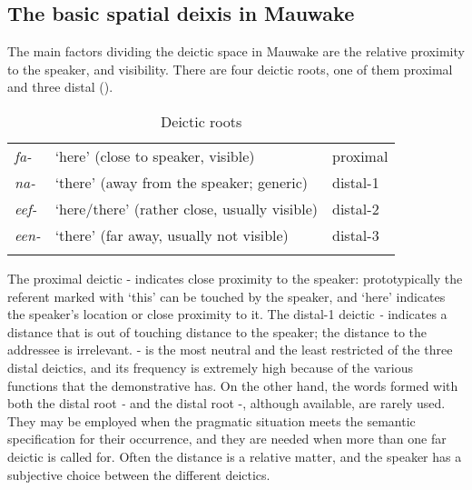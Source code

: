 \subsection{The basic spatial deixis in Mauwake}
{}
The main factors dividing the deictic space in Mauwake are the relative proximity to the speaker, and visibility. There are four deictic roots, one of them proximal and three distal (). 

\begin{table}
\caption{Deictic roots}
\label{tab:3:deicticroots}
 
\begin{tabular}{>{\itshape}lll}
\mytoprule
fa- &`here' (close to speaker, visible) &proximal\\
na- &`there' (away from the speaker; generic) &distal-1\\
eef- &`here/there' (rather close, usually visible) &distal-2\\
een- &`there' (far away, usually not visible) &distal-3\\
\mybottomrule
\end{tabular}
\end{table}


The proximal deictic - indicates close proximity to the speaker: prototypically the referent marked with  `this' can be touched by the speaker, and  `here' indicates the speaker's location or close proximity to it. The distal-1 deictic \textit{-} indicates a distance that is out of touching distance to the speaker; the distance to the addressee is irrelevant. - is the most neutral and the least restricted of the three distal deictics, and its frequency is extremely high because of the various functions that the demonstrative  has. On the other hand, the words formed with both the distal root \textit{\nobreakdash-} and the distal root \nobreakdash-, although available, are rarely used. They may be employed when the pragmatic situation meets the semantic specification for their occurrence, and they are needed when more than one far deictic is called for. Often the distance is a relative matter, and the speaker has a subjective choice between the different deictics.

